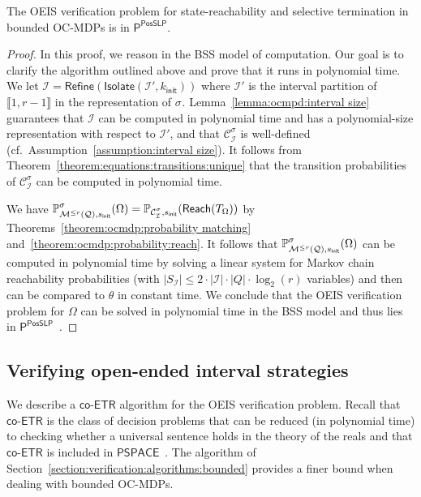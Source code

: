 \documentclass[a4paper,UKenglish,cleveref,autoref,thm-restate,colorlinks]{lipics-v2021}
\newcommand{\init}{\mathsf{init}}
\newcommand{\integerInterval}[1]{\llbracket{}#1\rrbracket{}}
\newcommand{\ptime}{\textsf{P}}
\newcommand{\pspace}{\textsf{PSPACE}}
\newcommand{\posSLP}{\textsf{PosSLP}}
\newcommand{\coetr}{\textsf{co-ETR}}
\newcommand{\mdp}{\mathcal{M}}
\newcommand{\mdpStateSpace}{S}
\newcommand{\ocmdp}{\mathcal{Q}}
\newcommand{\ocmdpFin}[2]{\mdp^{\leq #2}(#1)}
\newcommand{\ocStateSpace}{Q}
\newcommand{\ocCount}{k}
\newcommand{\ocConfig}{s}
\newcommand{\counterUB}{r}
\newcommand{\mchain}{\mathcal{C}}
\newcommand{\intPart}{\mathcal{I}}
\newcommand{\compressChainStrat}[1]{\mchain^{#1}_{\intPart}}
\newcommand{\compressChain}{\compressChainStrat{\strat}}
\newcommand{\compressChainStateSpace}{\mdpStateSpace_{\intPart}}
\newcommand{\objective}{\Omega}
\newcommand{\reach}[1]{\mathsf{Reach}(#1)}
\newcommand{\target}{T}
\newcommand{\thresProba}{\theta}
\newcommand{\stratGeneric}[1]{{\sigma_{#1}}}
\newcommand{\strat}{\stratGeneric{}}
\begin{document}
\begin{theorem}\label{theorem:verification:bounded}
  The OEIS verification problem for state-reachability and selective termination in bounded OC-MDPs is in $\ptime^{\posSLP}$.
\end{theorem}
\begin{proof}
    In this proof, we reason in the BSS model of computation.
  Our goal is to clarify the algorithm outlined above and prove that it runs in polynomial time.
  We let $\intPart=\mathsf{Refine}(\mathsf{Isolate}(\intPart', \ocCount_\init))$ where $\intPart'$ is the interval partition of $\integerInterval{1, \counterUB-1}$ in the representation of $\strat$.
  Lemma~\ref{lemma:ocmpd:interval size} guarantees that $\intPart$ can be computed in polynomial time and has a polynomial-size representation with respect to $\intPart'$, and that $\compressChain$ is well-defined (cf.~Assumption~\ref{assumption:interval size}).
  It follows from Theorem~\ref{theorem:equations:transitions:unique} that the transition probabilities of $\compressChain$ can be computed in polynomial time.

  We have $\probaGverb{\ocmdpFin{\ocmdp}{\counterUB}}{\ocConfig_\init}{\strat}(\objective)=\probaMCverb{\compressChain}{\ocConfig_\init}(\reach{\target_\objective})$ by Theorems~\ref{theorem:ocmdp:probability matching} and~\ref{theorem:ocmdp:probability:reach}.
  It follows that $\probaGverb{\ocmdpFin{\ocmdp}{\counterUB}}{\ocConfig_\init}{\strat}(\objective)$ can be computed in polynomial time by solving a linear system for Markov chain reachability probabilities (with $|\compressChainStateSpace|\leq 2\cdot|\intPart|\cdot |\ocStateSpace|\cdot \log_2(\counterUB)$ variables) and then can be compared to $\thresProba$ in constant time.
  We conclude that the OEIS verification problem for $\objective$ can be solved in polynomial time in the BSS model and thus lies in $\ptime^{\posSLP}$~\cite{DBLP:journals/siamcomp/AllenderBKM09}.
\end{proof}


\subsection{Verifying open-ended interval strategies}\label{section:verification:algorithms:oeis}

We describe a $\coetr$ algorithm for the OEIS verification problem.
Recall that $\coetr$ is the class of decision problems that can be reduced (in polynomial time) to checking whether a universal sentence holds in the theory of the reals and that $\coetr$ is included in $\pspace$~\cite{DBLP:conf/stoc/Canny88}.
The algorithm of Section~\ref{section:verification:algorithms:bounded} provides a finer bound when dealing with bounded OC-MDPs.
\end{document}
